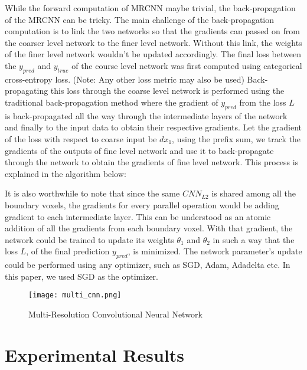 \documentclass[10pt,letterpaper]{article}
\begin{document}
While the forward computation of MRCNN maybe trivial, the back-propagation of the MRCNN can be tricky. The main challenge of the back-propagation computation is to link the two networks so that the gradients can passed on from the coarser level network to the finer level network. Without this link,  the weights of the finer level network wouldn't be updated accordingly. The final loss between the $y_{pred}$  and $y_{true}$ of the course level network was first computed using categorical cross-entropy loss. (Note: Any other loss metric may also be used) Back-propagating this loss through the coarse level network is performed using the traditional back-propagation method where the gradient of $y_{pred}$ from the loss $L$ is back-propagated all the way through the intermediate layers of the network and finally to the input data to obtain their respective gradients. Let the gradient of the loss with respect to coarse input be $dx_1$, using the prefix sum, we track the gradients of the outputs of fine level network and use it to back-propagate through the network to obtain the gradients of fine level network. This process is explained in the algorithm below: 


It is also worthwhile to note that since the same $CNN_{L2}$ is shared among all the boundary voxels, the gradients for every parallel operation would be adding gradient to each intermediate layer. This can be understood as an atomic addition of all the gradients from each boundary voxel. With that gradient, the network could be trained to update its weights  $\theta_1$ and  $\theta_2$  in such a way that the loss $L$, of the final prediction $y_{pred}$, is minimized. The network parameter's update  could be performed using any optimizer, such as SGD, Adam, Adadelta etc. In this paper, we used SGD as the optimizer.

\begin{figure*}[h]
 \centering
 \texttt{[image: multi\_cnn.png]}
 \caption{Multi-Resolution Convolutional Neural Network}
 \label{Fig:MultiLevelCNN}
\end{figure*}


\section{Experimental Results}
\label{Sec:Results}
\end{document}
